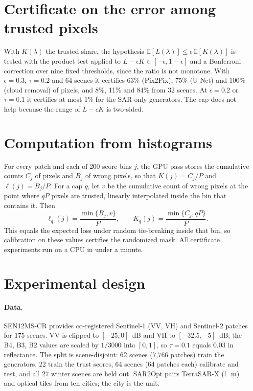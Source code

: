 \documentclass[11pt,a4paper]{article}
\theoremstyle{definition}
\theoremstyle{remark}
\newcommand{\E}{\mathbb{E}}
\newcommand{\1}{\mathbf{1}}
\begin{document}
\section{Certificate on the error among trusted pixels}

With $K(\lambda)$ the trusted share, the hypothesis $\E[L(\lambda)]\le\epsilon\,\E[K(\lambda)]$ is tested with the product test applied to $L-\epsilon K\in[-\epsilon,1-\epsilon]$ and a Bonferroni correction over nine fixed thresholds, since the ratio is not monotone. With $\epsilon=0.3$, $\tau=0.2$ and 64 scenes it certifies 63\% (Pix2Pix), 75\% (U-Net) and 100\% (cloud removal) of pixels, and 8\%, 11\% and 84\% from 32 scenes. At $\epsilon=0.2$ or $\tau=0.1$ it certifies at most 1\% for the SAR-only generators. The cap does not help because the range of $L-\epsilon K$ is two-sided.

\section{Computation from histograms}

For every patch and each of 200 score bins $j$, the GPU pass stores the cumulative counts $C_j$ of pixels and $B_j$ of wrong pixels, so that $K(j)=C_j/P$ and $\ell(j)=B_j/P$. For a cap $q$, let $v$ be the cumulative count of wrong pixels at the point where $qP$ pixels are trusted, linearly interpolated inside the bin that contains it. Then
\begin{equation}
\ell_q(j)=\frac{\min\{B_j,v\}}{P},\qquad K_q(j)=\frac{\min\{C_j,qP\}}{P}.
\end{equation}
This equals the expected loss under random tie-breaking inside that bin, so calibration on these values certifies the randomized mask. All certificate experiments run on a CPU in under a minute.

\section{Experimental design}

\paragraph{Data.} SEN12MS-CR \cite{sen12mscr} provides co-registered Sentinel-1 (VV, VH) and Sentinel-2 patches for 175 scenes. VV is clipped to $[-25,0]$~dB and VH to $[-32.5,-5]$~dB; the B4, B3, B2 values are scaled by $1/3000$ into $[0,1]$, so $\tau=0.1$ equals 0.03 in reflectance. The split is scene-disjoint: 62 scenes (7{,}766 patches) train the generators, 22 train the trust scores, 64 scenes (64 patches each) calibrate and test, and all 27 winter scenes are held out. SAR2Opt \cite{sar2opt} pairs TerraSAR-X (1~m) and optical tiles from ten cities; the city is the unit.
\end{document}
